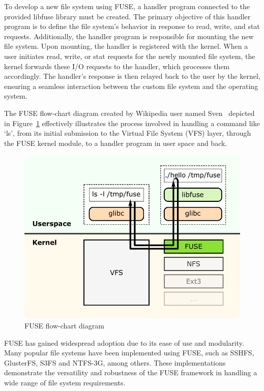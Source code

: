 To develop a new file system using FUSE, a handler program connected to the provided libfuse library must be created.
The primary objective of this handler program is to define the file system's behavior in response to read, write, and stat requests.
Additionally, the handler program is responsible for mounting the new file system.
Upon mounting, the handler is registered with the kernel.
When a user initiates read, write, or stat requests for the newly mounted file system, the kernel forwards these I/O requests to the handler, which processes them accordingly.
The handler's response is then relayed back to the user by the kernel, ensuring a seamless interaction between the custom file system and the operating system.

The FUSE flow-chart diagram created by Wikipedia user named Sven~\cite{fuse-diagram} depicted in Figure~\ref{fig:fuse-diagram} effectively illustrates the process involved in handling a command like `ls', from its initial submission to the Virtual File System (VFS) layer, through the FUSE kernel module, to a handler program in user space and back.

\begin{figure}[ht]
    \centering
    \includegraphics[width=\linewidth]{img/fuse_diagram}
    \caption{FUSE flow-chart diagram}\label{fig:fuse-diagram}
\end{figure}

FUSE has gained widespread adoption due to its ease of use and modularity.
Many popular file systems have been implemented using FUSE, such as SSHFS, GlusterFS, S3FS and NTFS-3G, among others.
These implementations demonstrate the versatility and robustness of the FUSE framework in handling a wide range of file system requirements.

